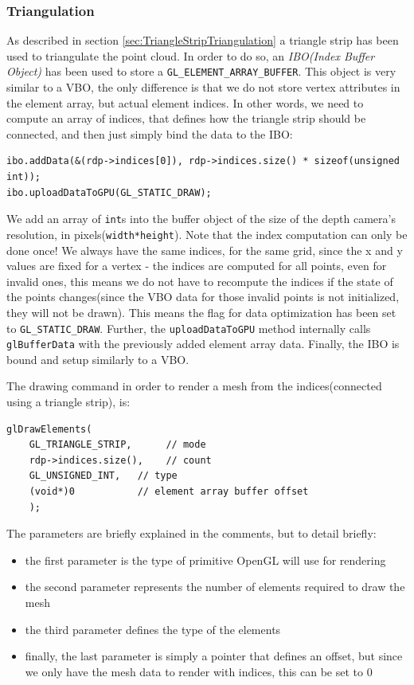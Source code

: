 \documentclass[]{article}
\begin{document}
\subsubsection{Triangulation}

As described in section \ref{sec:TriangleStripTriangulation} a triangle strip has been used to triangulate the point cloud. In order to do so, an \textit{IBO(Index Buffer Object)} has been used to store a \verb|GL_ELEMENT_ARRAY_BUFFER|. This object is very similar to a VBO, the only difference is that we do not store vertex attributes in the element array, but actual element indices. In other words, we need to compute an array of indices, that defines how the triangle strip should be connected, and then just simply bind the data to the IBO:
\begin{verbatim}
ibo.addData(&(rdp->indices[0]), rdp->indices.size() * sizeof(unsigned int));
ibo.uploadDataToGPU(GL_STATIC_DRAW);
\end{verbatim}

We add an array of \verb|int|s into the buffer object of the size of the depth camera's resolution, in pixels(\verb|width*height|). Note that the index computation can only be done once! We always have the same indices, for the same grid, since the x and y values are fixed for a vertex - the indices are computed for all points, even for invalid ones, this means we do not have to recompute the indices if the state of the points changes(since the VBO data for those invalid points is not initialized, they will not be drawn). This means the flag for data optimization has been set to \verb|GL_STATIC_DRAW|. Further, the \verb|uploadDataToGPU| method internally calls  \verb|glBufferData| with the previously added element array data. Finally, the IBO is bound and setup similarly to a VBO.

The drawing command in order to render a mesh from the indices(connected using a triangle strip), is:
\begin{verbatim}
glDrawElements(
	GL_TRIANGLE_STRIP,      // mode
	rdp->indices.size(),    // count
	GL_UNSIGNED_INT,   // type
	(void*)0           // element array buffer offset
	);
\end{verbatim}

The parameters are briefly explained in the comments, but to detail briefly:
\begin{itemize}
\item the first parameter is the type of primitive OpenGL will use for rendering
\item the second parameter represents the number of elements required to draw the mesh
\item the third parameter defines the type of the elements 
\item finally, the last parameter is simply a pointer that defines an offset, but since we only have the mesh data to render with indices, this can be set to 0
\end{itemize}
 
\end{document}
